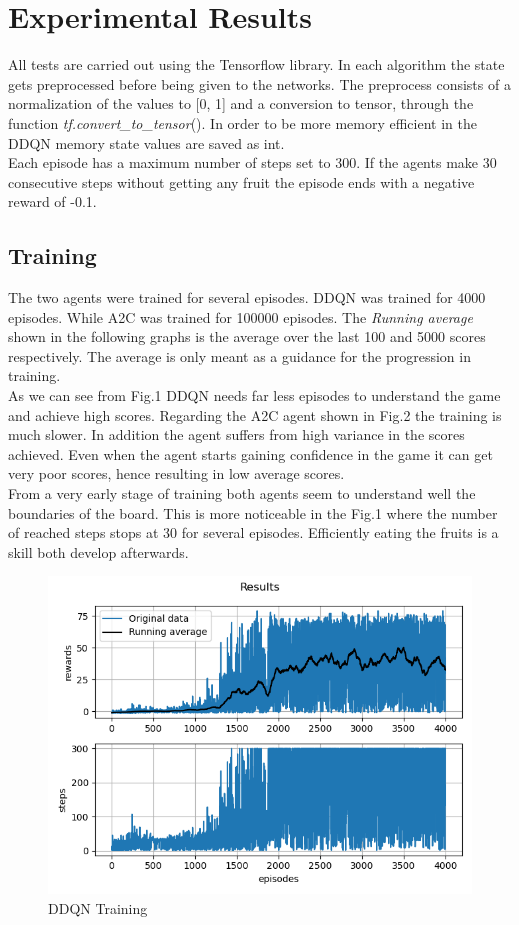 \documentclass[conference]{IEEEtran}
\begin{document}
\section{Experimental Results}
All tests are carried out using the Tensorflow library. In each algorithm the state gets preprocessed before being given to the networks. The preprocess
consists of a normalization of the values to [0, 1] and a conversion to tensor, through the function \textit{tf.convert\_to\_tensor}().
In order to be more memory efficient in the DDQN memory state values are saved as int.\\
Each episode has a maximum number of steps set to 300. If the agents make 30 consecutive steps without getting any fruit the episode ends
with a negative reward of -0.1.

\subsection{Training}
The two agents were trained for several episodes. DDQN was trained for 4000 episodes. While A2C was trained for 100000 episodes.
The \textit{Running average} shown in the following graphs is the average over the last 100 and 5000 scores respectively. The average is only meant as a guidance
for the progression in training.\\
As we can see from Fig.1 DDQN needs far less episodes to understand the game and achieve high scores. Regarding the A2C agent shown in Fig.2
the training is much slower. In addition the agent suffers from high variance in the scores achieved. Even when the agent starts
gaining confidence in the game it can get very poor scores, hence resulting in low average scores.\\
From a very early stage of training both agents seem to understand well the boundaries of the board. This is more noticeable in the
Fig.1 where the number of reached steps stops at 30 for several episodes. Efficiently eating the fruits is a skill both develop afterwards.

\begin{figure}[ht]
    \centering
    \includegraphics[scale=0.5]{training_snake_4000}
    \caption{DDQN Training}
\end{figure}
\end{document}
